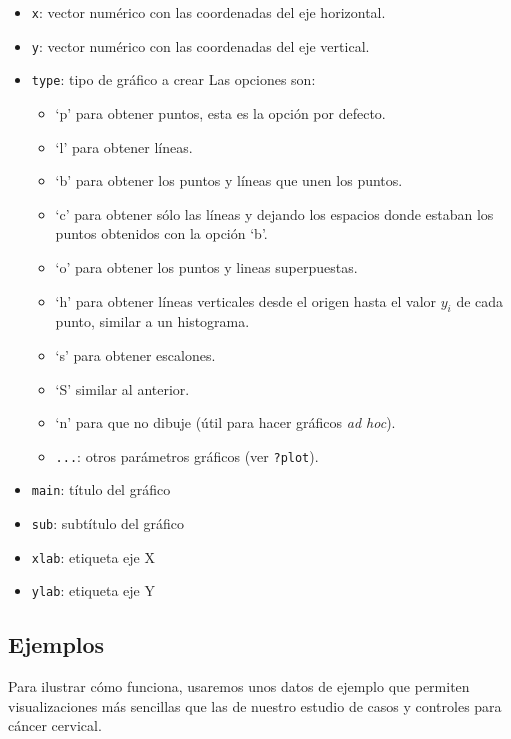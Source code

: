 \documentclass[
]{book}
\providecommand{\tightlist}{%
  \setlength{\itemsep}{0pt}\setlength{\parskip}{0pt}}
\begin{document}
\begin{itemize}
\tightlist
\item
  \texttt{x}: vector numérico con las coordenadas del eje horizontal.
\item
  \texttt{y}: vector numérico con las coordenadas del eje vertical.
\item
  \texttt{type}: tipo de gráfico a crear Las opciones son:

  \begin{itemize}
  \tightlist
  \item
    `p' para obtener puntos, esta es la opción por defecto.
  \item
    `l' para obtener líneas.
  \item
    `b' para obtener los puntos y líneas que unen los puntos.
  \item
    `c' para obtener sólo las líneas y dejando los espacios donde estaban los puntos obtenidos con la opción `b'.
  \item
    `o' para obtener los puntos y lineas superpuestas.
  \item
    `h' para obtener líneas verticales desde el origen hasta el valor \(y_i\) de cada punto, similar a un histograma.
  \item
    `s' para obtener escalones.
  \item
    `S' similar al anterior.
  \item
    `n' para que no dibuje (útil para hacer gráficos \emph{ad hoc}).
  \item
    \texttt{...}: otros parámetros gráficos (ver \texttt{?plot}).
  \end{itemize}
\item
  \texttt{main}: título del gráfico
\item
  \texttt{sub}: subtítulo del gráfico
\item
  \texttt{xlab}: etiqueta eje X
\item
  \texttt{ylab}: etiqueta eje Y
\end{itemize}

\hypertarget{ejemplos}{%
\subsection*{Ejemplos}\label{ejemplos}}

Para ilustrar cómo funciona, usaremos unos datos de ejemplo que permiten visualizaciones más sencillas que las de nuestro estudio de casos y controles para cáncer cervical.
\end{document}
